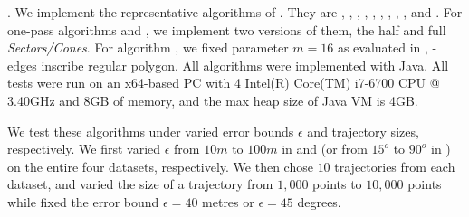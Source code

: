 


.
We implement the representative algorithms of . They are \opt, \dpa, \tpa, \opwa, \bqsa, \squishe, \operb, \siped, \cised, \intersec and \interval.
For one-pass algorithms \siped and \cised, we implement two versions of them, \ie the half and full \emph{Sectors/Cones}.
For algorithm \cised, we fixed parameter $m=16$ as evaluated in \cite{Lin:Cised}, -edges inscribe regular polygon.
All algorithms were implemented with Java.
All tests were run on an x64-based  PC with 4 Intel(R) Core(TM) i7-6700 CPU @
3.40GHz  and 8GB of memory, and {the max heap size of Java VM is 4GB.}


We test these algorithms under varied error bounds $\epsilon$ and trajectory sizes, respectively. We first varied $\epsilon$ from $10m$ to $100m$ in \ped and \sed (or from $15^o$ to $90^o$ in \dad) on the entire four datasets, respectively. We then chose $10$ trajectories from each dataset, and varied the size  of a trajectory from $1,000$ points to $10,000$ points while fixed the error bound $\epsilon=40$ metres or $\epsilon=45$ degrees.

